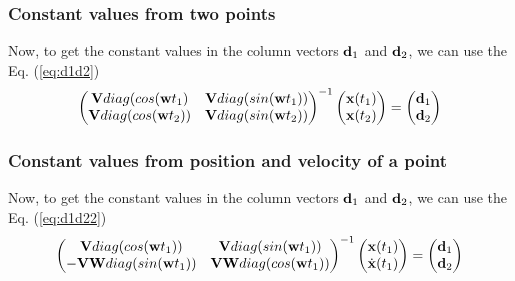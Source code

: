 \documentclass[11pt,twoside,a4paper]{article}
\newcommand{\MATRIX}[1]{\mathbf{\uppercase{#1}}}
\newcommand{\VECTOR}[1]{\mathbf{\lowercase{#1}}}
\newcommand{\funcdiag}{diag}
\begin{document}
\subsubsection{Constant values from two points}
Now, to get the constant values in the column vectors $\VECTOR{d}_1$ and $\VECTOR{d}_2$, we can
use the Eq. (\ref{eq:d1d2})
\begin{equation}\label{eq:d1d2}
  \left( 
 \begin{matrix}
\MATRIX{V}\funcdiag(cos(\VECTOR{w}t_1) & \MATRIX{V}\funcdiag(sin(\VECTOR{w}t_1))\\
\MATRIX{V}\funcdiag(cos(\VECTOR{w}t_2)) & \MATRIX{V}\funcdiag(sin(\VECTOR{w}t_2))\\
 \end{matrix}
 \right)^{-1}
 \left( 
 \begin{matrix}
\VECTOR{X}(t_1) \\
\VECTOR{X}(t_2)
 \end{matrix}
 \right)=
  \left( 
 \begin{matrix}
\VECTOR{d}_1 \\
\VECTOR{d}_2
 \end{matrix}
 \right)
\end{equation}

\subsubsection{Constant values from position and velocity of a point}
Now, to get the constant values in the column vectors $\VECTOR{d}_1$ and $\VECTOR{d}_2$, we can
use the Eq. (\ref{eq:d1d22})
\begin{equation}\label{eq:d1d22}
  \left( 
 \begin{matrix}
\MATRIX{V}\funcdiag(cos(\VECTOR{w}t_1)) & \MATRIX{V}\funcdiag(sin(\VECTOR{w}t_1))\\
-\MATRIX{V}\MATRIX{W}\funcdiag(sin(\VECTOR{w}t_1)) & \MATRIX{V}\MATRIX{W}\funcdiag(cos(\VECTOR{w}t_1))\\
 \end{matrix}
 \right)^{-1}
 \left( 
 \begin{matrix}
\VECTOR{X}(t_1) \\
\dot{\VECTOR{X}}(t_1)
 \end{matrix}
 \right)=
  \left( 
 \begin{matrix}
\VECTOR{d}_1 \\
\VECTOR{d}_2
 \end{matrix}
 \right)
\end{equation}
\end{document}
